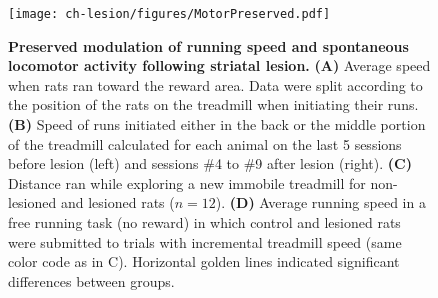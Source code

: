 \begin{figure}[bth!]
 \begin{center}
	\texttt{[image: ch-lesion/figures/MotorPreserved.pdf]}
	\caption[]
	{\textbf{Preserved modulation of running speed and spontaneous locomotor activity following striatal lesion.}
	\textbf{(A)} Average speed when rats ran toward the reward area. Data were split according to the position of the rats on the treadmill when initiating their runs.
	\textbf{(B)} Speed of runs initiated either in the back or the middle portion of the treadmill calculated for each animal on the last 5 sessions before lesion (left) and sessions \#4 to \#9 after lesion (right).
	\textbf{(C)} Distance ran while exploring a new immobile treadmill for non-lesioned and lesioned rats ($n=12$).
	\textbf{(D)} Average running speed in a free running task (no reward) in which control and lesioned rats were submitted to trials with incremental treadmill speed (same color code as in C).
	Horizontal golden lines indicated significant differences between groups.
	}
	\label{fig:lesion:motorOk}
 \end{center}
\end{figure}
